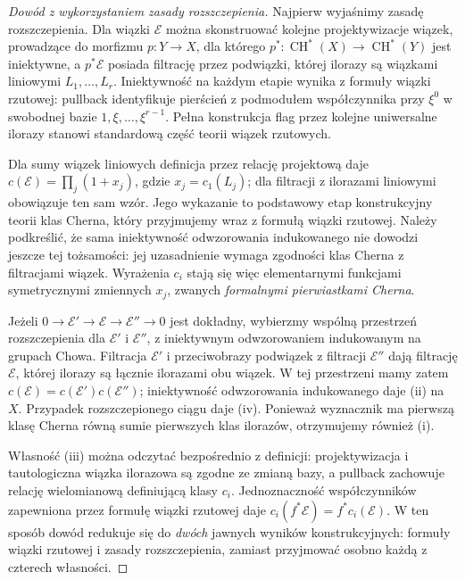 \begin{proof}[Dowód z wykorzystaniem zasady rozszczepienia]
Najpierw wyjaśnimy zasadę rozszczepienia. Dla wiązki
$\mathcal E$ można skonstruować kolejne projektywizacje
wiązek, prowadzące do morfizmu $p:Y\to X$, dla którego
$p^*:\operatorname{CH}^*(X)\to\operatorname{CH}^*(Y)$
jest iniektywne, a $p^*\mathcal E$ posiada filtrację
przez podwiązki, której ilorazy są wiązkami liniowymi
$L_1,\ldots,L_r$. Iniektywność na każdym etapie
wynika z formuły wiązki rzutowej: pullback
identyfikuje pierścień z podmodułem współczynnika
przy $\xi^0$ w swobodnej bazie $1,\xi,\ldots,\xi^{r-1}$.
Pełna konstrukcja flag przez kolejne uniwersalne ilorazy
stanowi standardową część teorii wiązek rzutowych.

Dla sumy wiązek liniowych definicja przez relację
projektową daje
$c(\mathcal E)=\prod_j(1+x_j)$,
gdzie $x_j=c_1(L_j)$; dla filtracji z ilorazami liniowymi
obowiązuje ten sam wzór. Jego wykazanie to podstawowy
etap konstrukcyjny teorii klas Cherna, który
przyjmujemy wraz z formułą wiązki rzutowej.
Należy podkreślić, że sama iniektywność odwzorowania indukowanego
nie dowodzi jeszcze tej tożsamości: jej uzasadnienie
wymaga zgodności klas Cherna z filtracjami wiązek.
Wyrażenia $c_i$ stają się więc elementarnymi funkcjami
symetrycznymi zmiennych $x_j$, zwanych
\emph{formalnymi pierwiastkami Cherna}.

Jeżeli $0\to\mathcal E'\to\mathcal E\to\mathcal E''\to0$
jest dokładny, wybierzmy wspólną przestrzeń rozszczepienia
dla $\mathcal E'$ i $\mathcal E''$, z iniektywnym
odwzorowaniem indukowanym na grupach Chowa. Filtracja
$\mathcal E'$ i przeciwobrazy podwiązek z filtracji
$\mathcal E''$ dają filtrację $\mathcal E$,
której ilorazy są łącznie ilorazami obu wiązek.
W tej przestrzeni mamy zatem
$c(\mathcal E)=c(\mathcal E')c(\mathcal E'')$;
iniektywność odwzorowania indukowanego daje (ii) na $X$.
Przypadek rozszczepionego ciągu daje (iv).
Ponieważ wyznacznik ma pierwszą klasę Cherna równą
sumie pierwszych klas ilorazów, otrzymujemy również (i).

Własność (iii) można odczytać bezpośrednio z definicji:
projektywizacja i tautologiczna wiązka ilorazowa
są zgodne ze zmianą bazy, a pullback zachowuje relację
wielomianową definiującą klasy $c_i$. Jednoznaczność
współczynników zapewniona przez formułę wiązki rzutowej
daje $c_i(f^*\mathcal E)=f^*c_i(\mathcal E)$.
W ten sposób dowód redukuje się do \emph{dwóch} jawnych
wyników konstrukcyjnych: formuły wiązki rzutowej
i zasady rozszczepienia, zamiast przyjmować osobno
każdą z czterech własności.
\end{proof}

